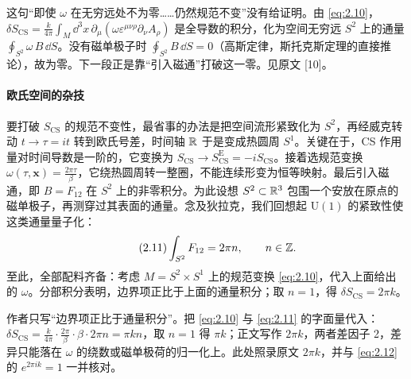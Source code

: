 \begin{yizhu}[含糊点]
这句“即使 $\omega$ 在无穷远处不为零……仍然规范不变”没有给证明。由 \eqref{eq:2.10}，$\delta S_{\mathrm{CS}}=\frac{k}{4\pi}\int_M\dd^3x\,\partial_\mu(\omega\varepsilon^{\mu\nu\rho}\partial_\nu A_\rho)$ 是全导数的积分，化为空间无穷远 $S^2$ 上的通量 $\oint_{S^2}\omega\,B\,\dd S$。没有磁单极子时 $\oint_{S^2}B\,\dd S=0$（高斯定律，斯托克斯定理的直接推论），故为零。下一段正是靠“引入磁通”打破这一零。见原文 [10]。
\end{yizhu}

\paragraph{欧氏空间的杂技} %
要打破 $S_{\mathrm{CS}}$ 的规范不变性，最省事的办法是把空间流形紧致化为 $S^2$，再经威克转动 $t\to\tau=it$ 转到欧氏号差，时间轴 $\mathbb{R}$ 于是变成热圆周 $S^1$。关键在于，CS 作用量对时间导数是一阶的，它变换为 $S_{\mathrm{CS}}\to S^{\mathrm{E}}_{\mathrm{CS}}=-iS_{\mathrm{CS}}$。接着选规范变换 $\omega(\tau,\mathbf{x})=\frac{2\pi\tau}{\beta}$，它绕热圆周转一整圈，不能连续形变为恒等映射。最后引入磁通，即 $B=F_{12}$ 在 $S^2$ 上的非零积分。为此设想 $S^2\subset\mathbb{R}^3$ 包围一个安放在原点的磁单极子，再测穿过其表面的通量。念及狄拉克，我们回想起 $\mathrm{U}(1)$ 的紧致性使这类通量量子化：
\begin{equation}\tag{2.11}\label{eq:2.11}
  \int_{S^2} F_{12} = 2\pi n, \qquad n\in\mathbb{Z} .
\end{equation}
至此，全部配料齐备：考虑 $M=S^2\times S^1$ 上的规范变换 \eqref{eq:2.10}，代入上面给出的 $\omega$。分部积分表明，边界项正比于上面的通量积分；取 $n=1$，得 $\delta S_{\mathrm{CS}}=2\pi k$。

\begin{yizhu}[含糊点]
作者只写“边界项正比于通量积分”。把 \eqref{eq:2.10} 与 \eqref{eq:2.11} 的字面量代入：$\delta S_{\mathrm{CS}}=\frac{k}{4\pi}\cdot\frac{2\pi}{\beta}\cdot\beta\cdot2\pi n=\pi kn$，取 $n=1$ 得 $\pi k$；正文写作 $2\pi k$，两者差因子 2，差异只能落在 $\omega$ 的绕数或磁单极荷的归一化上。此处照录原文 $2\pi k$，并与 \eqref{eq:2.12} 的 $e^{2\pi ik}=1$ 一并核对。
\end{yizhu}

